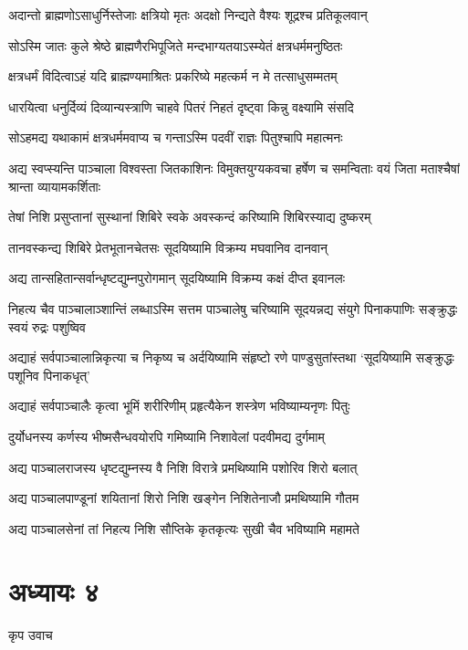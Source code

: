 \twolineshloka
{अदान्तो ब्राह्मणोऽसाधुर्निस्तेजाः क्षत्रियो मृतः}
{अदक्षो निन्द्यते वैश्यः शूद्रश्च प्रतिकूलवान्}


\twolineshloka
{सोऽस्मि जातः कुले श्रेष्ठे ब्राह्मणैरभिपूजिते}
{मन्दभाग्यतयाऽस्म्येतं क्षत्रधर्ममनुष्ठितः}


\twolineshloka
{क्षत्रधर्मं विदित्वाऽहं यदि ब्राह्मण्यमाश्रितः}
{प्रकरिष्ये महत्कर्म न मे तत्साधुसम्मतम्}


\twolineshloka
{धारयित्वा धनुर्दिव्यं दिव्यान्यस्त्राणि चाहवे}
{पितरं निहतं दृष्ट्वा किन्नु वक्ष्यामि संसदि}


\twolineshloka
{सोऽहमद्य यथाकामं क्षत्रधर्ममवाप्य च}
{गन्ताऽस्मि पदवीं राज्ञः पितुश्चापि महात्मनः}


\threelineshloka
{अद्य स्वप्स्यन्ति पाञ्चाला विश्वस्ता जितकाशिनः}
{विमुक्तयुग्यकवचा हर्षेण च समन्विताः}
{वयं जिता मताश्चैषां श्रान्ता व्यायामकर्शिताः}


\twolineshloka
{तेषां निशि प्रसुप्तानां सुस्थानां शिबिरे स्वके}
{अवस्कन्दं करिष्यामि शिबिरस्याद्य दुष्करम्}


\twolineshloka
{तानवस्कन्द्य शिबिरे प्रेतभूतानचेतसः}
{सूदयिष्यामि विक्रम्य मघवानिव दानवान्}


\twolineshloka
{अद्य तान्सहितान्सर्वान्धृष्टद्युम्नपुरोगमान्}
{सूदयिष्यामि विक्रम्य कक्षं दीप्त इवानलः}


निहत्य चैव पाञ्चालाञ्शान्तिं लब्धाऽस्मि सत्तम
\twolineshloka
{पाञ्चालेषु चरिष्यामि सूदयन्नद्य संयुगे}
{पिनाकपाणिः सङ्क्रुद्धः स्वयं रुद्रः पशुष्विव}


\threelineshloka
{अद्याहं सर्वपाञ्चालान्निकृत्या च निकृष्य च}
{अर्दयिष्यामि संहृष्टो रणे पाण्डुसुतांस्तथा}
{`सूदयिष्यामि सङ्क्रुद्धः पशूनिव पिनाकधृत्'}


\twolineshloka
{अद्याहं सर्वपाञ्चालैः कृत्वा भूमिं शरीरिणीम्}
{प्रहृत्यैकेन शस्त्रेण भविष्याम्यनृणः पितुः}


\twolineshloka
{दुर्योधनस्य कर्णस्य भीष्मसैन्धवयोरपि}
{गमिष्यामि निशावेलां पदवीमद्य दुर्गमाम्}


\twolineshloka
{अद्य पाञ्चालराजस्य धृष्टद्युम्नस्य वै निशि}
{विरात्रे प्रमथिष्यामि पशोरिव शिरो बलात्}


\twolineshloka
{अद्य पाञ्चालपाण्डूनां शयितानां शिरो निशि}
{खङ्गेन निशितेनाजौ प्रमथिष्यामि गौतम}


\twolineshloka
{अद्य पाञ्चालसेनां तां निहत्य निशि सौप्तिके}
{कृतकृत्यः सुखी चैव भविष्यामि महामते}


\chapter{अध्यायः ४}
\twolineshloka
{कृप उवाच}
{}


